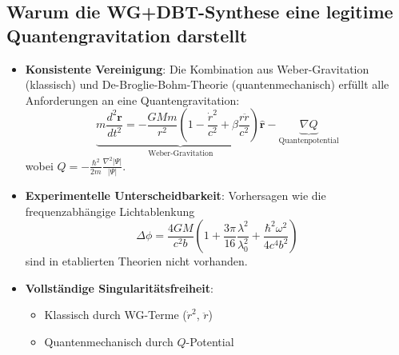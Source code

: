 \subsection*{Warum die WG+DBT-Synthese eine legitime Quantengravitation darstellt}
\begin{itemize}
    \item \textbf{Konsistente Vereinigung}: Die Kombination aus Weber-Gravitation (klassisch) und De-Broglie-Bohm-Theorie (quantenmechanisch) erfüllt alle Anforderungen an eine Quantengravitation:
    \begin{equation}
        \underbrace{m\frac{d^2\mathbf{r}}{dt^2} = -\frac{GMm}{r^2}\left(1-\frac{\dot{r}^2}{c^2}+\beta\frac{r\ddot{r}}{c^2}\right)\hat{\mathbf{r}}}_{\text{Weber-Gravitation}} - \underbrace{\nabla Q}_{\text{Quantenpotential}}
    \end{equation}
    wobei $Q = -\frac{\hbar^2}{2m}\frac{\nabla^2|\Psi|}{|\Psi|}$.
    
    \item \textbf{Experimentelle Unterscheidbarkeit}: Vorhersagen wie die frequenzabhängige Lichtablenkung
    \begin{equation}
        \Delta\phi = \frac{4GM}{c^2b}\left(1 + \frac{3\pi}{16}\frac{\lambda^2}{\lambda_0^2} + \frac{\hbar^2\omega^2}{4c^4b^2}\right)
    \end{equation}
    sind in etablierten Theorien nicht vorhanden.
    
    \item \textbf{Vollständige Singularitätsfreiheit}: 
    \begin{itemize}
        \item Klassisch durch WG-Terme ($\dot{r}^2$, $\ddot{r}$)
        \item Quantenmechanisch durch $Q$-Potential
    \end{itemize}
\end{itemize}


